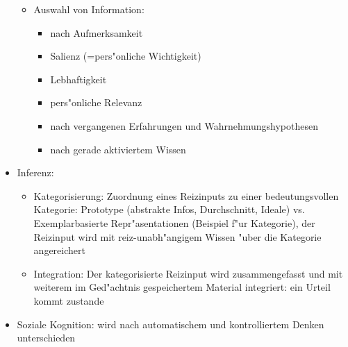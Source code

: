 \begin{itemize}
\begin{itemize}
			\item
				Auswahl von Information:
				\begin{itemize}
					\item
						nach Aufmerksamkeit
					\item
						Salienz (=pers"onliche Wichtigkeit)
					\item
						Lebhaftigkeit
					\item
						pers"onliche Relevanz
					\item
						nach vergangenen Erfahrungen und Wahrnehmungshypothesen
					\item
						nach gerade aktiviertem Wissen
				\end{itemize}
		\end{itemize}
	\item
		Inferenz:
		\begin{itemize}
			\item
				Kategorisierung: Zuordnung eines Reizinputs zu einer bedeutungsvollen Kategorie: Prototype (abstrakte Infos, Durchschnitt, Ideale) vs. Exemplarbasierte Repr"asentationen (Beispiel f"ur Kategorie), der Reizinput wird mit reiz-unabh"angigem Wissen "uber die Kategorie angereichert
			\item
				Integration: Der kategorisierte Reizinput wird zusammengefasst und mit weiterem im Ged"achtnis gespeichertem Material integriert: ein Urteil kommt zustande
		\end{itemize}
	\item
		Soziale Kognition: wird nach automatischem und kontrolliertem Denken unterschieden
\end{itemize}

